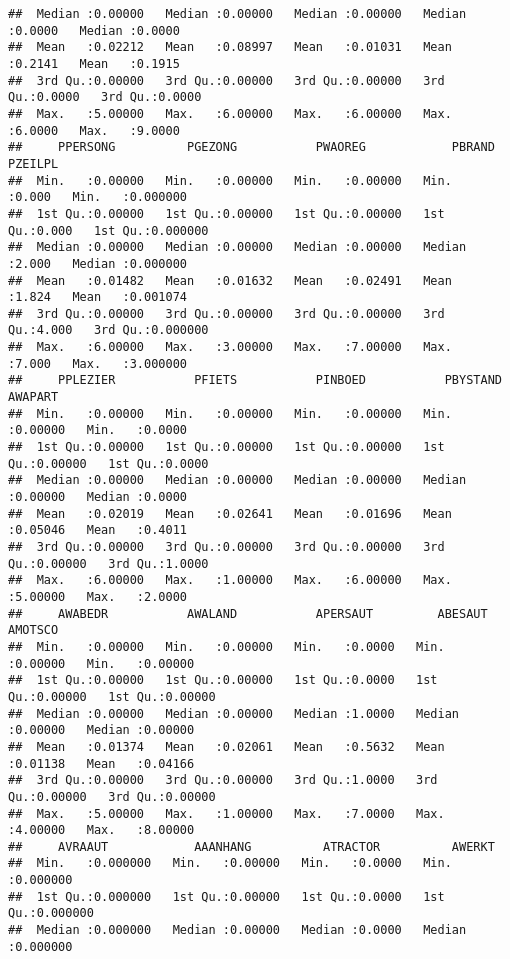 \documentclass{article}\usepackage[]{graphicx}\usepackage[]{xcolor}
\makeatletter
\newenvironment{kframe}{%
 \def\at@end@of@kframe{}%
 \ifinner\ifhmode%
  \def\at@end@of@kframe{\end{minipage}}%
  \begin{minipage}{\columnwidth}%
 \fi\fi%
 \def\FrameCommand##1{\hskip\@totalleftmargin \hskip-\fboxsep
 \colorbox{shadecolor}{##1}\hskip-\fboxsep
     \hskip-\linewidth \hskip-\@totalleftmargin \hskip\columnwidth}%
 \MakeFramed {\advance\hsize-\width
   \@totalleftmargin\z@ \linewidth\hsize
   \@setminipage}}%
 {\par\unskip\endMakeFramed%
 \at@end@of@kframe}
\newenvironment{knitrout}{}{} %
\makeatother
\begin{document}
\begin{knitrout}
\begin{kframe}
\begin{verbatim}
##  Median :0.00000   Median :0.00000   Median :0.00000   Median :0.0000   Median :0.0000  
##  Mean   :0.02212   Mean   :0.08997   Mean   :0.01031   Mean   :0.2141   Mean   :0.1915  
##  3rd Qu.:0.00000   3rd Qu.:0.00000   3rd Qu.:0.00000   3rd Qu.:0.0000   3rd Qu.:0.0000  
##  Max.   :5.00000   Max.   :6.00000   Max.   :6.00000   Max.   :6.0000   Max.   :9.0000  
##     PPERSONG          PGEZONG           PWAOREG            PBRAND         PZEILPL        
##  Min.   :0.00000   Min.   :0.00000   Min.   :0.00000   Min.   :0.000   Min.   :0.000000  
##  1st Qu.:0.00000   1st Qu.:0.00000   1st Qu.:0.00000   1st Qu.:0.000   1st Qu.:0.000000  
##  Median :0.00000   Median :0.00000   Median :0.00000   Median :2.000   Median :0.000000  
##  Mean   :0.01482   Mean   :0.01632   Mean   :0.02491   Mean   :1.824   Mean   :0.001074  
##  3rd Qu.:0.00000   3rd Qu.:0.00000   3rd Qu.:0.00000   3rd Qu.:4.000   3rd Qu.:0.000000  
##  Max.   :6.00000   Max.   :3.00000   Max.   :7.00000   Max.   :7.000   Max.   :3.000000  
##     PPLEZIER           PFIETS           PINBOED           PBYSTAND          AWAPART      
##  Min.   :0.00000   Min.   :0.00000   Min.   :0.00000   Min.   :0.00000   Min.   :0.0000  
##  1st Qu.:0.00000   1st Qu.:0.00000   1st Qu.:0.00000   1st Qu.:0.00000   1st Qu.:0.0000  
##  Median :0.00000   Median :0.00000   Median :0.00000   Median :0.00000   Median :0.0000  
##  Mean   :0.02019   Mean   :0.02641   Mean   :0.01696   Mean   :0.05046   Mean   :0.4011  
##  3rd Qu.:0.00000   3rd Qu.:0.00000   3rd Qu.:0.00000   3rd Qu.:0.00000   3rd Qu.:1.0000  
##  Max.   :6.00000   Max.   :1.00000   Max.   :6.00000   Max.   :5.00000   Max.   :2.0000  
##     AWABEDR           AWALAND           APERSAUT         ABESAUT           AMOTSCO       
##  Min.   :0.00000   Min.   :0.00000   Min.   :0.0000   Min.   :0.00000   Min.   :0.00000  
##  1st Qu.:0.00000   1st Qu.:0.00000   1st Qu.:0.0000   1st Qu.:0.00000   1st Qu.:0.00000  
##  Median :0.00000   Median :0.00000   Median :1.0000   Median :0.00000   Median :0.00000  
##  Mean   :0.01374   Mean   :0.02061   Mean   :0.5632   Mean   :0.01138   Mean   :0.04166  
##  3rd Qu.:0.00000   3rd Qu.:0.00000   3rd Qu.:1.0000   3rd Qu.:0.00000   3rd Qu.:0.00000  
##  Max.   :5.00000   Max.   :1.00000   Max.   :7.0000   Max.   :4.00000   Max.   :8.00000  
##     AVRAAUT            AAANHANG          ATRACTOR          AWERKT        
##  Min.   :0.000000   Min.   :0.00000   Min.   :0.0000   Min.   :0.000000  
##  1st Qu.:0.000000   1st Qu.:0.00000   1st Qu.:0.0000   1st Qu.:0.000000  
##  Median :0.000000   Median :0.00000   Median :0.0000   Median :0.000000  

\end{verbatim}
\end{kframe}
\end{knitrout}
\end{document}
